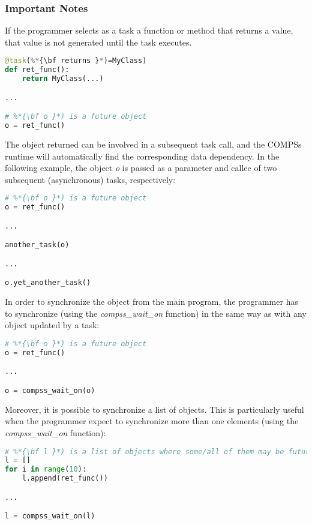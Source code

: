 \subsubsection{Important Notes}

If the programmer selects as a task a function or method that returns a value, that value is not 
generated until the task executes. 

\begin{lstlisting}[language=python]
@task(%*{\bf returns }*)=MyClass)
def ret_func():
    return MyClass(...)

...

# %*{\bf o }*) is a future object
o = ret_func()
\end{lstlisting}

The object returned can be involved in a subsequent task call, and the COMPSs runtime will automatically 
find the corresponding data dependency. In the following example, the object \textit{o} is passed as a parameter 
and callee of two subsequent (asynchronous) tasks, respectively:

\begin{lstlisting}[language=python]
# %*{\bf o }*) is a future object
o = ret_func()

...

another_task(o)

...

o.yet_another_task()
\end{lstlisting}

In order to synchronize the object from the main program, the programmer has to synchronize (using the \textit{compss\_wait\_on} function) in the same way 
as with any object updated by a task:

\begin{lstlisting}[language=python]
# %*{\bf o }*) is a future object
o = ret_func()

...

o = compss_wait_on(o)
\end{lstlisting}
                         
Moreover, it is possible to synchronize a list of objects. This is particularly useful when the programmer expect to synchronize more 
than one elements (using the \textit{compss\_wait\_on} function):

\begin{lstlisting}[language=python]
# %*{\bf l }*) is a list of objects where some/all of them may be future objects
l = []
for i in range(10):
    l.append(ret_func())

...

l = compss_wait_on(l)
\end{lstlisting}
                         
